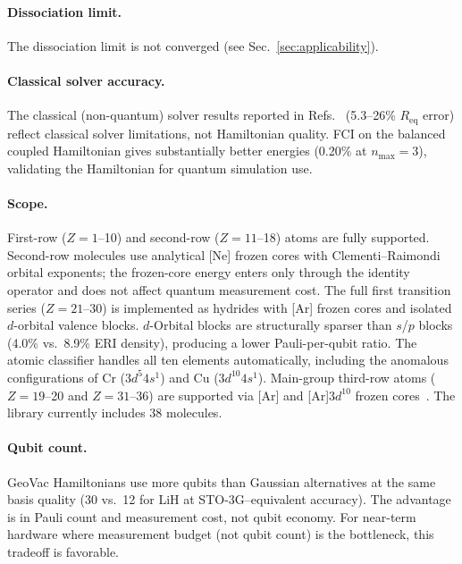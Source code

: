 \documentclass[twocolumn,pra,amsmath,amssymb,superscriptaddress]{revtex4-2}
\begin{document}
\paragraph{Dissociation limit.}
The dissociation limit is not converged (see Sec.~\ref{sec:applicability}).

\paragraph{Classical solver accuracy.}
The classical (non-quantum) solver results reported in
Refs.~\cite{GeoVac_Paper17,GeoVac_Paper19} (5.3--26\% $R_{\text{eq}}$
error) reflect classical solver limitations, not Hamiltonian quality.
FCI on the balanced coupled Hamiltonian gives substantially better
energies (0.20\% at $n_{\max}=3$), validating the Hamiltonian for
quantum simulation use.

\paragraph{Scope.}
First-row ($Z=1$--10) and second-row ($Z=11$--18) atoms are fully
supported.  Second-row molecules use analytical [Ne] frozen cores
with Clementi--Raimondi orbital exponents; the frozen-core energy
enters only through the identity operator and does not affect
quantum measurement cost.
The full first transition series ($Z = 21$--30) is implemented as
hydrides with [Ar] frozen cores and isolated $d$-orbital valence blocks.
$d$-Orbital blocks are structurally sparser than $s$/$p$ blocks
(4.0\% vs.\ 8.9\% ERI density), producing a lower Pauli-per-qubit
ratio.  The atomic classifier handles all ten elements automatically,
including the anomalous configurations of Cr ($3d^5 4s^1$) and Cu ($3d^{10} 4s^1$).
Main-group third-row atoms
($Z=19$--20 and $Z=31$--36) are supported via [Ar]
and [Ar]3$d^{10}$ frozen cores~\cite{GeoVac_ScopeBoundary}.
The library currently includes 38 molecules.

\paragraph{Qubit count.}
GeoVac Hamiltonians use more qubits than Gaussian alternatives at the
same basis quality (30 vs.\ 12 for LiH at STO-3G--equivalent accuracy).
The advantage is in Pauli count and measurement cost, not qubit economy.
For near-term hardware where measurement budget (not qubit count) is
the bottleneck, this tradeoff is favorable.

\end{document}
